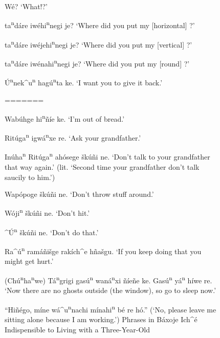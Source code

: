 \documentclass[output=paper]{LSP/langsci}
\begin{document}
\begin{figure}[p]
\begin{list}{}{}
\item{W\'e? `What!?'}
\item{\underline{\hspace{1em}} ta\textsuperscript{n}dáre iw\'ehi\textsuperscript{n}negi  je? `Where did you put my [horizontal] \underline{\hspace{1em}}?'}
\item{\underline{\hspace{1em}} ta\textsuperscript{n}dáre iw\'ejehi\textsuperscript{n}negi je? `Where did you put my [vertical] \underline{\hspace{1em}}?'}
\item{\underline{\hspace{1em}} ta\textsuperscript{n}dáre iw\'enahi\textsuperscript{n}negi je? `Where did you put my [round] \underline{\hspace{1em}}?'}
\item{\'U\textsuperscript{n}nek\^{ }u\textsuperscript{n} hag\'u\textsuperscript{n}ta ke. `I want you to give it back.'}
\end{list} 
\caption{``Hiñ\'ego, míne wá\^{ }u\textsuperscript{n}nachi mínahi\textsuperscript{n} b\'e re hó.''\newline
(`No, please leave me sitting alone because I am working.')\newline
Phrases in Báxoje Ich\^{ }\'e Indispensible to Living with a Three-Year-Old}
=======
\item{Wab\'uhge hi\textsuperscript{n}\~n\'ie ke. `I'm out of bread.'}
\item{Rit\'uga\textsuperscript{n} igw\'a\textsuperscript{n}xe re. `Ask your grandfather.'}
\item{In\'uha\textsuperscript{n} Rit\'uga\textsuperscript{n} ah\'osege šk\'u\~ni ne. `Don't talk to your grandfather that way again.' (lit. `Second time your grandfather don't talk saucily to him.')}
\item{Wap\'opoge \v{s}k\'u\~ni ne. `Don't throw stuff around.'}
\item{W\'oji\textsuperscript{n} \v{s}k\'u\~ni ne. `Don't hit.'}
\item{\^{ }\'U\textsuperscript{n} \v{s}k\'u\~ni ne. `Don't do that.'}
\item{}
\item{Ra\^{ }\'u\textsuperscript{n} ram\'a\~ni\v{s}ge rak\'ich\^{ }e h\~na\v{s}gu. `If you keep doing that you might get hurt.'}
\item{(Ch\'u\textsuperscript{n}ha\textsuperscript{n}we) T\'a\textsuperscript{n}grigi gas\'u\textsuperscript{n} wan\'a\textsuperscript{n}xi \~n\'ie\~ne ke. Gas\'u\textsuperscript{n} y\'a\textsuperscript{n} h\'iwe re. `Now there are no ghosts outside (the window), so go to sleep now.'}

\end{figure}
\end{document}
